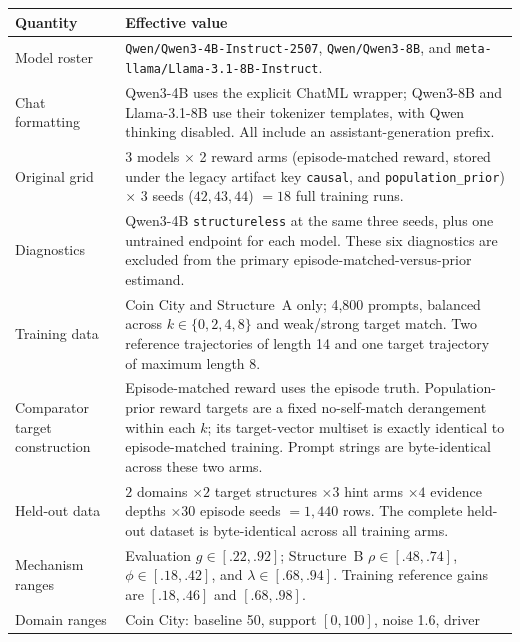 \begin{center}
\begin{minipage}{\linewidth}
\centering
{}
\label{tab:exp3-coin-structural-hparams}
\scriptsize
\setlength{\tabcolsep}{3pt}
\begin{tabular}{p{.29\linewidth}p{.66\linewidth}}
\toprule
\textbf{Quantity} & \textbf{Effective value} \\
\midrule
Model roster & \texttt{Qwen/Qwen3-4B-Instruct-2507},
\texttt{Qwen/Qwen3-8B}, and \texttt{meta-llama/Llama-3.1-8B-Instruct}. \\
Chat formatting & Qwen3-4B uses the explicit ChatML wrapper; Qwen3-8B and
Llama-3.1-8B use their tokenizer templates, with Qwen thinking disabled. All
include an assistant-generation prefix. \\
Original grid & 3 models $\times$ 2 reward arms
(episode-matched reward, stored under the legacy artifact key \texttt{causal}, and \texttt{population\_prior}) $\times$ 3 seeds
($42,43,44$) $=18$ full training runs. \\
Diagnostics & Qwen3-4B \texttt{structureless} at the same three seeds, plus one
untrained endpoint for each model. These six diagnostics are excluded from the primary
episode-matched-versus-prior estimand. \\
Training data & Coin City and Structure~A only; 4,800 prompts, balanced across
$k\in\{0,2,4,8\}$ and weak/strong target match. Two reference trajectories of
length 14 and one target trajectory of maximum length 8. \\
Comparator target construction & Episode-matched reward uses the episode truth.
Population-prior reward targets are a fixed no-self-match derangement within
each $k$; its target-vector multiset is exactly identical to episode-matched training.
Prompt strings are byte-identical across these two arms. \\
Held-out data & $2$ domains $\times2$ target structures $\times3$ hint arms
$\times4$ evidence depths $\times30$ episode seeds $=1,440$ rows. The complete
held-out dataset is byte-identical across all training arms. \\
Mechanism ranges & Evaluation $g\in[.22,.92]$; Structure~B
$\rho\in[.48,.74]$, $\phi\in[.18,.42]$, and $\lambda\in[.68,.94]$.
Training reference gains are $[.18,.46]$ and $[.68,.98]$. \\
Domain ranges & Coin City: baseline 50, support $[0,100]$, noise 1.6, driver

\end{tabular}
\end{minipage}
\end{center}
